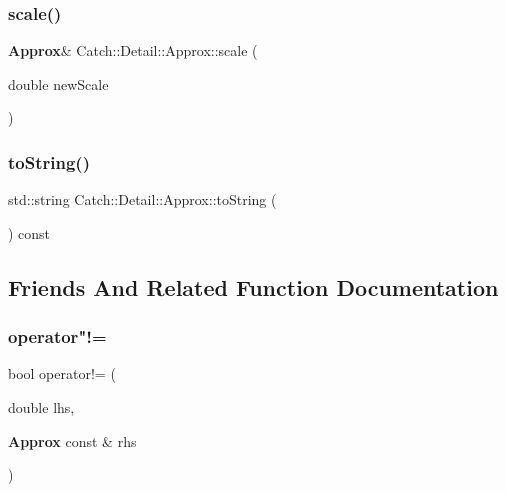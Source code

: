 \subsubsection{scale()}
{\footnotesize\ttfamily \textbf{ Approx}\& Catch\+::\+Detail\+::\+Approx\+::scale (\begin{DoxyParamCaption}\item[{double}]{new\+Scale }\end{DoxyParamCaption})\hspace{0.3cm}{\ttfamily [inline]}}

\mbox{\label{class_catch_1_1_detail_1_1_approx_a972fd9ac60607483263f1b0f0f9955e6}} 
\subsubsection{to\+String()}
{\footnotesize\ttfamily std\+::string Catch\+::\+Detail\+::\+Approx\+::to\+String (\begin{DoxyParamCaption}{ }\end{DoxyParamCaption}) const\hspace{0.3cm}{\ttfamily [inline]}}



\subsection{Friends And Related Function Documentation}
\mbox{\label{class_catch_1_1_detail_1_1_approx_a83b3763569a7ecc143c335b630be0e47}} 
\subsubsection{operator"!=\hspace{0.1cm}{\footnotesize\ttfamily [1/2]}}
{\footnotesize\ttfamily bool operator!= (\begin{DoxyParamCaption}\item[{double}]{lhs,  }\item[{\textbf{ Approx} const \&}]{rhs }\end{DoxyParamCaption})\hspace{0.3cm}{\ttfamily [friend]}}


